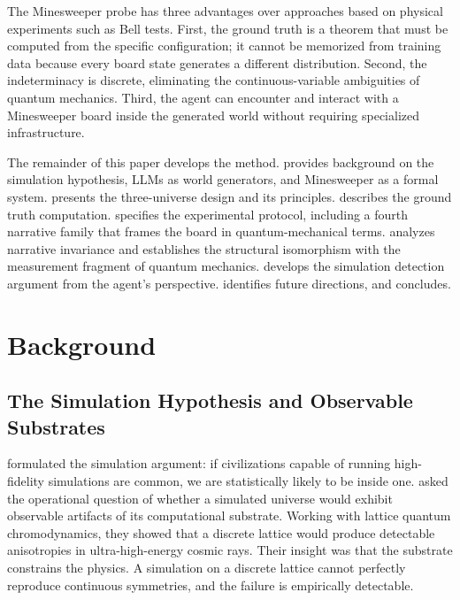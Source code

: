 \documentclass[12pt,a4paper]{article}
\begin{document}
The Minesweeper probe has three advantages over approaches based on physical experiments such as Bell tests. First, the ground truth is a theorem that must be computed from the specific configuration; it cannot be memorized from training data because every board state generates a different distribution. Second, the indeterminacy is discrete, eliminating the continuous-variable ambiguities of quantum mechanics. Third, the agent can encounter and interact with a Minesweeper board inside the generated world without requiring specialized infrastructure.

The remainder of this paper develops the method.  provides background on the simulation hypothesis, LLMs as world generators, and Minesweeper as a formal system.  presents the three-universe design and its principles.  describes the ground truth computation.  specifies the experimental protocol, including a fourth narrative family that frames the board in quantum-mechanical terms.  analyzes narrative invariance and establishes the structural isomorphism with the measurement fragment of quantum mechanics.  develops the simulation detection argument from the agent's perspective.  identifies future directions, and  concludes.

\section{Background}
\label{sec:background}

\subsection{The Simulation Hypothesis and Observable Substrates}
\label{sec:simulation_hypothesis}

\citet{bostrom2003} formulated the simulation argument: if civilizations capable of running high-fidelity simulations are common, we are statistically likely to be inside one. \citet{beane2014} asked the operational question of whether a simulated universe would exhibit observable artifacts of its computational substrate. Working with lattice quantum chromodynamics, they showed that a discrete lattice would produce detectable anisotropies in ultra-high-energy cosmic rays. Their insight was that the substrate constrains the physics. A simulation on a discrete lattice cannot perfectly reproduce continuous symmetries, and the failure is empirically detectable.
\end{document}

